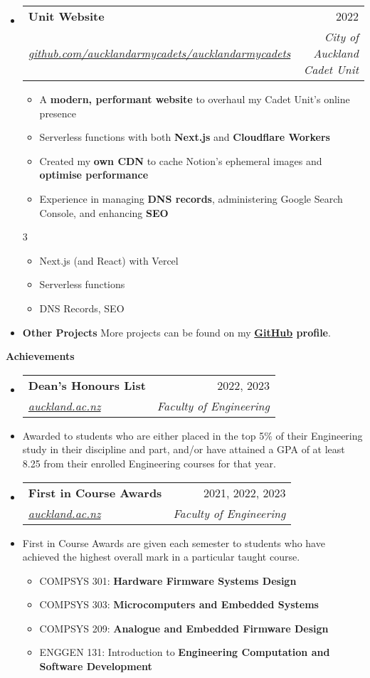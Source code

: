 \documentclass[11pt,a4paper]{article}[leftmargin=*]
\makeatletter
\def \entryspacing {-0pt}
\def \bulletstylei {\faAngleRight\hspace{-4.5pt}}
\def \bulletstyleii {\faCaretRight\hspace{-4.5pt}}
\renewcommand{\section}[2]{\vspace{5pt}
  \colorbox{secondary}{\color{white}\raggedbottom\normalsize\textbf{{#1}{\hspace{2pt}#2\hspace{4pt}}}}
}
\newcommand{\resumeEntryStart}{\begin{itemize}[leftmargin=2.5mm]}
\newcommand{\resumeEntryEnd}{\end{itemize}\vspace{\entryspacing}}
\newcommand{\resumeItemListStart}{\begin{itemize}[leftmargin=4.5mm]}
\newcommand{\resumeItemListEnd}{\end{itemize}}
\newcommand{\resumeItemListStartColumns}[2][-0.5]{\vspace*{#1\multicolsep}
\begin{multicols}{#2}\begin{itemize}[leftmargin=4.5mm]}
\newcommand{\resumeItemListEndColumns}[1][-1]{\end{itemize}\end{multicols}\vspace*{#1\multicolsep}}
\newcommand{\resumeItem}[2][\bulletstylei]{
  \item[\small#1]\small{
    {#2 \vspace{-2pt}}
  }
}
\newcommand{\resumeEntryTSDL}[4]{
  \vspace{-1pt}\item[]
    \begin{tabularx}{0.97\textwidth}{X@{\hspace{60pt}}r}
      \textbf{\color{primary}#1} & {\firabook\color{accent}\small#2} \\
      \textit{\color{accent}\small#3} & \textit{\color{accent}\small#4} \\
    \end{tabularx}\vspace{-6pt}
}
\newcommand{\resumeEntryS}[2]{
  \item[]\small{
    \textbf{\color{primary}#1 }{ #2 \vspace{-4pt}}
  }
}
\newcommand{\resumeEntryP}[1]{
  \item[]\small{
    #1 \vspace{-4pt}
  }\\
}
\newcommand{\resumeBf}[1]{\small\textbf{\color{halfbold}#1}}
\makeatother
\begin{document}
\resumeEntryStart
\resumeEntryTSDL
{Unit Website}{2022}
{\href{https://github.com/aucklandarmycadets/aucklandarmycadets}{github.com/aucklandarmycadets/aucklandarmycadets}}{City of Auckland Cadet Unit}
\resumeItemListStart
\resumeItem {A \resumeBf{modern, performant website} to overhaul my Cadet Unit's online presence}
\resumeItem {Serverless functions with both \resumeBf{Next.js} and \resumeBf{Cloudflare Workers}}
\resumeItem {Created my \resumeBf{own CDN} to cache Notion's ephemeral images and \resumeBf{optimise performance}}
\resumeItem {Experience in managing \resumeBf{DNS records}, administering Google Search Console, and enhancing \resumeBf{SEO}}
\resumeItemListEnd
\resumeItemListStartColumns{3}
\resumeItem[\bulletstyleii] {Next.js (and React) with Vercel}
\resumeItem[\bulletstyleii] {Serverless functions}
\resumeItem[\bulletstyleii] {DNS Records, SEO}
\resumeItemListEndColumns
\resumeEntryEnd

\resumeEntryStart
\resumeEntryS
{Other Projects}{More projects can be found on my \resumeBf{\href{https://github.com/jamesnzl}{GitHub} profile}.}
\resumeEntryEnd


\section{\faTrophy}{Achievements}

\resumeEntryStart
\resumeEntryTSDL
{Dean's Honours List}{2022, 2023}
{\href{https://www.auckland.ac.nz/en/engineering/current-students/undergraduate/deans-honours-list.html}{auckland.ac.nz}}{Faculty of Engineering}
\resumeEntryP {Awarded to students who are either placed in the top 5\% of their Engineering study in their discipline and part, and/or have attained a GPA of at least 8.25 from their enrolled Engineering courses for that year.}
\resumeEntryEnd

\resumeEntryStart
\resumeEntryTSDL
{First in Course Awards}{2021, 2022, 2023}
{\href{https://www.auckland.ac.nz/assets/study/scholarships-and-funding/find-a-scholarship-or-award/regulations/first-in-course-award.pdf}{auckland.ac.nz}}{Faculty of Engineering}
\resumeEntryP {First in Course Awards are given each semester to students who have achieved the highest overall mark in a particular taught course.}
\resumeItemListStart
\resumeItem {COMPSYS 301: \resumeBf{Hardware Firmware Systems Design}}
\resumeItem {COMPSYS 303: \resumeBf{Microcomputers and Embedded Systems}}
\resumeItem {COMPSYS 209: \resumeBf{Analogue and Embedded Firmware Design}}
\resumeItem {ENGGEN 131: Introduction to \resumeBf{Engineering Computation and Software Development}}
\resumeItemListEnd
\resumeEntryEnd
\end{document}
